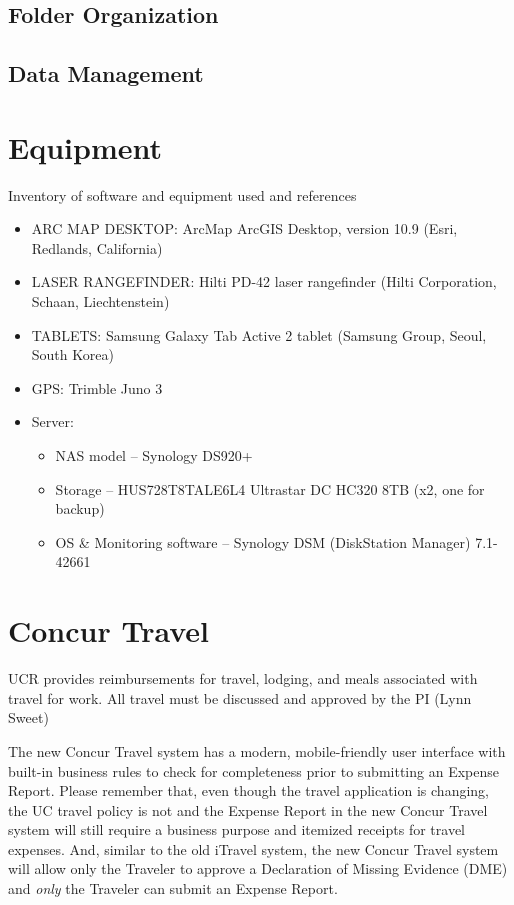 \documentclass[
]{book}
\providecommand{\tightlist}{%
  \setlength{\itemsep}{0pt}\setlength{\parskip}{0pt}}
\begin{document}
\hypertarget{folder-organization}{%
\section{Folder Organization}\label{folder-organization}}

\hypertarget{data-management}{%
\section{Data Management}\label{data-management}}

\hypertarget{equipment}{%
\chapter{Equipment}\label{equipment}}

Inventory of software and equipment used and references

\begin{itemize}
\item
  ARC MAP DESKTOP: ArcMap ArcGIS Desktop, version 10.9 (Esri, Redlands, California)
\item
  LASER RANGEFINDER: Hilti PD-42 laser rangefinder (Hilti Corporation, Schaan, Liechtenstein)
\item
  TABLETS: Samsung Galaxy Tab Active 2 tablet (Samsung Group, Seoul, South Korea)
\item
  GPS: Trimble Juno 3
\item
  Server:

  \begin{itemize}
  \tightlist
  \item
    NAS model -- Synology DS920+
  \item
    Storage -- HUS728T8TALE6L4 Ultrastar DC HC320 8TB (x2, one for backup)
  \item
    OS \& Monitoring software -- Synology DSM (DiskStation Manager) 7.1-42661
  \end{itemize}
\end{itemize}

\hypertarget{concur}{%
\chapter{Concur Travel}\label{concur}}

UCR provides reimbursements for travel, lodging, and meals associated with travel for work. All travel must be discussed and approved by the PI (Lynn Sweet)

The new Concur Travel system has a modern, mobile-friendly user interface with built-in business rules to check for completeness prior to submitting an Expense Report. Please remember that, even though the travel application is changing, the UC travel policy is not and the Expense Report in the new Concur Travel system will still require a business purpose and itemized receipts for travel expenses. And, similar to the old iTravel system, the new Concur Travel system will allow only the Traveler to approve a Declaration of Missing Evidence (DME) and \emph{only} the Traveler can submit an Expense Report.
\end{document}
